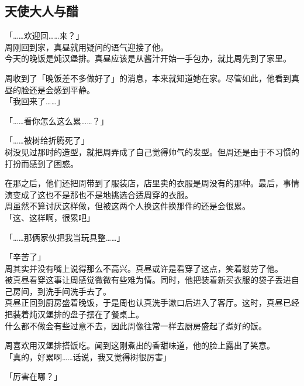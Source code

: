 \subsection{天使大人与醋}

「……欢迎回……来？」\\

周刚回到家，真昼就用疑问的语气迎接了他。\\

今天的晚饭是炖汉堡排。真昼应该是从酱汁开始一手包办，就比周先到了家里。

周收到了「晚饭差不多做好了」的消息，本来就知道她在家。尽管如此，他看到真昼的脸还是会感到平静。\\

「我回来了……」

「……看你怎么这么累……？」

「……被树给折腾死了」\\

树没见过那时的造型，就把周弄成了自己觉得帅气的发型。但周还是由于不习惯的打扮而感到了困惑。

在那之后，他们还把周带到了服装店，店里卖的衣服是周没有的那种。最后，事情演变成了这也不是那也不是地挑选合适周穿的衣服。\\

周虽然不算讨厌这样做，但被这两个人换这件换那件的还是会很累。\\

「这、这样啊，很累吧」

「……那俩家伙把我当玩具整……」

「辛苦了」\\

周其实并没有嘴上说得那么不高兴。真昼或许是看穿了这点，笑着慰劳了他。\\

被真昼看穿这事让周感觉微微有些难为情。同时，他把装着新买衣服的袋子丢进自己房间，到洗手间洗手去了。\\

真昼正回到厨房盛着晚饭，于是周也认真洗手漱口后进入了客厅。这时，真昼已经把装着炖汉堡排的盘子摆在了餐桌上。\\

什么都不做会有些过意不去，因此周像往常一样去厨房盛起了煮好的饭。

周喜欢用汉堡排搭饭吃。闻到这刚煮出的香甜味道，他的脸上露出了笑意。\\

「真的，好累啊……话说，我又觉得树很厉害」

「厉害在哪？」\\

